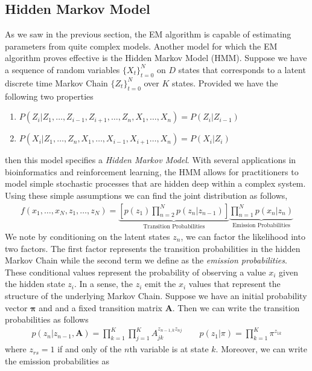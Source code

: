 \documentclass{article}
\begin{document}
\subsection{Hidden Markov Model}
As we saw in the previous section, the EM algorithm is capable of estimating parameters from quite complex models. Another model for which the EM algorithm proves effective is the Hidden Markov Model (HMM). Suppose we have a sequence of random variables $\{X_t\}_{t=0}^{N}$ on $D$ states that corresponds to a latent discrete time Markov Chain $\{Z_t\}_{t= 0}^{N}$ over $K$ states. Provided we have the following two properties 
\begin{enumerate}
\item $P(Z_i|Z_1, \ldots, Z_{i-1},Z_{i+1},\ldots, Z_n, X_1, \ldots, X_n) = P(Z_{i}|Z_{i-1})$
\item $P(X_i|Z_1,\ldots, Z_n, X_1, \ldots, X_{i-1},X_{i+1}\ldots, X_n) = P(X_{i}|Z_{i})$
\end{enumerate}
then this model specifies a \textit{Hidden Markov Model}. With several applications in bioinformatics and reinforcement learning, the HMM allows for practitioners to model simple stochastic processes that are hidden deep within a complex system. Using these simple assumptions we can find the joint distribution as follows, 
\begin{align*}
f(x_1,\ldots, x_N, z_1, \ldots, z_N) = \underbrace{\left[p(z_1)\prod_{n=2}^{N}p(z_n|z_{n-1})\right]}_{\text{Transition Probabilities}}\underbrace{\prod_{n=1}^Np(x_n|z_n)}_{\text{Emission Probabilities}} 
\end{align*} 
We note by conditioning on the latent states $z_n$, we can factor the likelihood into two factors. The first factor represents the transition probabilities in the hidden Markov Chain while the second term we define as the \textit{emission probabilities}. These conditional values represent the probability of observing a value $x_i$ given the hidden state $z_i$. In a sense, the $z_i$ emit the $x_i$ values that represent the structure of the underlying Markov Chain. Suppose we have an initial probability vector $\boldsymbol{\pi}$ and and a fixed transition matrix $\mathbf{A}$. Then we can write the transition probabilities as follows 
\begin{align*}
p(z_n|z_{n-1},\mathbf{A}) = \prod_{k=1}^{K}\prod_{j=1}^{K}A_{jk}^{z_{n-1,k}z_{nj}}\hspace{2em} p(z_1|\pi) = \prod_{k=1}^{K}\pi^{z_{1k}}
\end{align*}
where $z_{rs} = 1$ if and only of the $n$th variable is at state $k$. Moreover, we can write the emission probabilities as 
\end{document}
